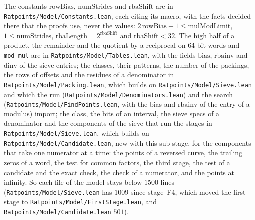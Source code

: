 The constants $\mathrm{rowBias}$, $\mathrm{numStrides}$ and $\mathrm{rbaShift}$ are in
\verb|Ratpoints/Model/Constants.lean|, each citing its macro, with the facts decided there that the
proofs use, never the values: $2\,\mathrm{rowBias} - 1 \le \mathrm{mulModLimit}$,
$1 \le \mathrm{numStrides}$, $\mathrm{rbaLength} = 2^{\mathrm{rbaShift}}$ and
$\mathrm{rbaShift} < 32$. The high half of a product, the remainder and the quotient by a reciprocal
on $64$-bit words and \verb|mod_mul| are in \verb|Ratpoints/Model/Tables.lean|, with the fields
$\mathrm{bias}$, $\mathrm{rbainv}$ and $\mathrm{dinv}$ of the sieve entries; the classes, their
patterns, the number of the packings, the rows of offsets and the residues of a denominator in
\verb|Ratpoints/Model/Packing.lean|, which builds on \verb|Ratpoints/Model/Sieve.lean| and which the
run (\verb|Ratpoints/Model/Denominators.lean|) and the search
(\verb|Ratpoints/Model/FindPoints.lean|, with the bias and $\mathrm{rbainv}$ of the entry of a
modulus) import; the class, the bits of an interval, the sieve specs of a denominator and the
components of the sieve that run the stages in \verb|Ratpoints/Model/Sieve.lean|, which builds on
\verb|Ratpoints/Model/Candidate.lean|, new with this sub-stage, for the components that take one
numerator at a time: the points of a reversed curve, the trailing zeros of a word, the test for
common factors, the third stage, the test of a candidate and the exact check, the check of a
numerator, and the points at infinity. So each file of the model stays below $1500$ lines
(\verb|Ratpoints/Model/Sieve.lean| has $1009$ since stage~F4, which moved the first stage to
\verb|Ratpoints/Model/FirstStage.lean|, and \verb|Ratpoints/Model/Candidate.lean| $501$).

